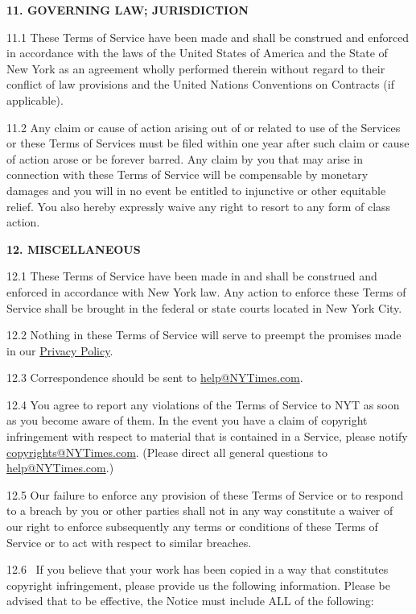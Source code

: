 \textbf{11. GOVERNING LAW; JURISDICTION}

11.1 These Terms of Service have been made and shall be construed and
enforced in accordance with the laws of the United States of America and
the State of New York as an agreement wholly performed therein without
regard to their conflict of law provisions and the United Nations
Conventions on Contracts (if applicable).

11.2 Any claim or cause of action arising out of or related to use of
the Services or these Terms of Services must be filed within one year
after such claim or cause of action arose or be forever barred. Any
claim by you that may arise in connection with these Terms of Service
will be compensable by monetary damages and you will in no event be
entitled to injunctive or other equitable relief. You also hereby
expressly waive any right to resort to any form of class action.

\textbf{12. MISCELLANEOUS}

12.1 These Terms of Service have been made in and shall be construed and
enforced in accordance with New York law. Any action to enforce these
Terms of Service shall be brought in the federal or state courts located
in New York City.

12.2 Nothing in these Terms of Service will serve to preempt the
promises made in our
\href{https://help.nytimes3xbfgragh.onion/hc/en-us/articles/115014892108-Privacy-policy}{Privacy
Policy}.

12.3 Correspondence should be sent to
\href{mailto:help@NYTimes.com}{help@NYTimes.com}.

12.4 You agree to report any violations of the Terms of Service to NYT
as soon as you become aware of them. In the event you have a claim of
copyright infringement with respect to material that is contained in a
Service, please notify
\href{mailto:copyrights@NYTimes.com}{copyrights@NYTimes.com}. (Please
direct all general questions to
\href{mailto:help@NYTimes.com}{help@NYTimes.com}.)

12.5 Our failure to enforce any provision of these Terms of Service or
to respond to a breach by you or other parties shall not in any way
constitute a waiver of our right to enforce subsequently any terms or
conditions of these Terms of Service or to act with respect to similar
breaches.

12.6 ~If you believe that your work has been copied in a way that
constitutes copyright infringement, please provide us the following
information. Please be advised that to be effective, the Notice must
include ALL of the following:

